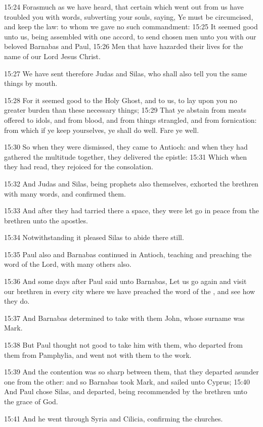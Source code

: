 15:24 Forasmuch as we have heard, that certain which went out from us
have troubled you with words, subverting your souls, saying, Ye must
be circumcised, and keep the law: to whom we gave no such commandment:
15:25 It seemed good unto us, being assembled with one accord, to send
chosen men unto you with our beloved Barnabas and Paul, 15:26 Men that
have hazarded their lives for the name of our Lord Jesus Christ.

15:27 We have sent therefore Judas and Silas, who shall also tell you
the same things by mouth.

15:28 For it seemed good to the Holy Ghost, and to us, to lay upon you
no greater burden than these necessary things; 15:29 That ye abstain
from meats offered to idols, and from blood, and from things
strangled, and from fornication: from which if ye keep yourselves, ye
shall do well. Fare ye well.

15:30 So when they were dismissed, they came to Antioch: and when they
had gathered the multitude together, they delivered the epistle: 15:31
Which when they had read, they rejoiced for the consolation.

15:32 And Judas and Silas, being prophets also themselves, exhorted
the brethren with many words, and confirmed them.

15:33 And after they had tarried there a space, they were let go in
peace from the brethren unto the apostles.

15:34 Notwithstanding it pleased Silas to abide there still.

15:35 Paul also and Barnabas continued in Antioch, teaching and
preaching the word of the Lord, with many others also.

15:36 And some days after Paul said unto Barnabas, Let us go again and
visit our brethren in every city where we have preached the word of
the \LORD, and see how they do.

15:37 And Barnabas determined to take with them John, whose surname
was Mark.

15:38 But Paul thought not good to take him with them, who departed
from them from Pamphylia, and went not with them to the work.

15:39 And the contention was so sharp between them, that they departed
asunder one from the other: and so Barnabas took Mark, and sailed unto
Cyprus; 15:40 And Paul chose Silas, and departed, being recommended by
the brethren unto the grace of God.

15:41 And he went through Syria and Cilicia, confirming the churches.

